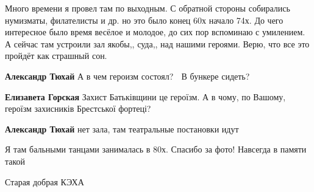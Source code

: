  
 
 
 
 

\qqSecCmt


Много времени я провел там по выходным. С обратной стороны собирались
нумизматы, филателисты и др. но это было конец 60х начало 74х. До чего
интересное было время весёлое и молодое, до сих пор вспоминаю с умилением. А
сейчас там устроили зал якобы,, суда,, над нашими героями. Верю, что все это
пройдёт как страшный сон.

\begin{itemize} %
\textbf{Александр Тюхай}
А в чем героизм состоял? 🤔
В бункере сидеть?

\textbf{Елизавета Горская} Захист Батьківщини це героїзм. А в чому, по Вашому, героїзм захисників Брестської фортеці?

\textbf{Александр Тюхай} нет зала, там театральные постановки идут

\end{itemize} %


Я там бальными танцами занималась в 80х. Спасибо за фото! Навсегда в памяти такой


Старая добрая КЭХА 🤟
